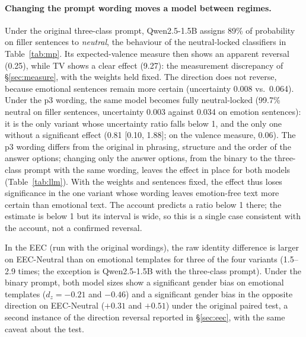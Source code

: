 \documentclass[runningheads]{llncs}
\begin{document}
\paragraph{Changing the prompt wording moves a model between regimes.}
Under the original three-class prompt, Qwen2.5-1.5B assigns 89\% of probability
on filler sentences to \emph{neutral}, the behaviour of the neutral-locked
classifiers in Table~\ref{tab:mp}. Its expected-valence measure then shows an
apparent reversal (0.25), while TV shows a clear effect (9.27): the measurement
discrepancy of \S\ref{sec:measure}, with the weights held fixed. The direction
does not reverse, because emotional sentences remain more certain (uncertainty
0.008 vs.\ 0.064). Under the p3 wording, the same model becomes fully
neutral-locked (99.7\% neutral on filler sentences, uncertainty 0.003 against
0.034 on emotion sentences): it is the only variant whose uncertainty ratio
falls below 1, and the only one without a significant effect (0.81 [0.10,
1.88]; on the valence measure, 0.06). The p3 wording differs from the original
in phrasing, structure and the order of the answer options; changing only the
answer options, from the binary to the three-class prompt with the same wording,
leaves the effect in place for both models (Table~\ref{tab:llm}). With the
weights and sentences fixed, the effect thus loses significance in the one
variant whose wording leaves emotion-free text more certain than emotional
text. The account predicts a ratio below 1 there; the estimate is below 1 but
its interval is wide, so this is a single case consistent with the account,
not a confirmed reversal.



In the EEC (run with the original wordings), the raw identity difference is
larger on EEC-Neutral than on emotional templates for three of the four variants (1.5--2.9 times; the
exception is Qwen2.5-1.5B with the three-class prompt). Under the binary prompt,
both model sizes show a significant gender bias on emotional templates
($d_z=-0.21$ and $-0.46$) and a significant gender bias in the opposite
direction on EEC-Neutral ($+0.31$ and $+0.51$) under the original paired
test, a second instance of the direction reversal reported in
\S\ref{sec:eec}, with the same caveat about the test.
\end{document}
